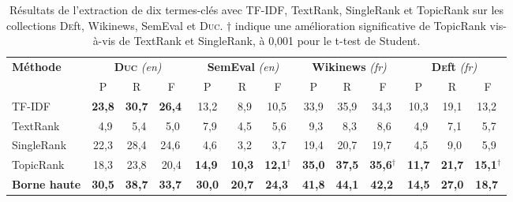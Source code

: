         \begin{table}[t]
          \centering
          \begin{tabular}{l|c@{~~}c@{~~}c@{~}|c@{~~}c@{~~}c@{~}|c@{~~}c@{~~}c@{~}|c@{~~}c@{~~}c@{~}}
            \toprule
            \multirow{2}{*}[-2pt]{\textbf{Méthode}} & \multicolumn{3}{c|}{\textbf{\textsc{Duc}} \textit{(en)}} & \multicolumn{3}{c|}{\textbf{SemEval} \textit{(en)}} & \multicolumn{3}{c|}{\textbf{Wikinews} \textit{(fr)}} & \multicolumn{3}{c}{\textbf{\textsc{De}ft} \textit{(fr)}}\\
            \cline{2-4}\cline{5-7}\cline{8-10}\cline{11-13}
            & P & R & F & P & R & F & P & R & F & P & R & F\\
            \hline
            TF-IDF & \textbf{23,8} & \textbf{30,7} & \textbf{26,4}$^{~}$ & 13,2 & $~~$8,9 & 10,5$^{~}$ & 33,9 & 35,9 & 34,3$^{~}$ & 10,3 & 19,1 & 13,2$^{~}$\\
            TextRank & $~~$4,9 & $~~$5,4 & $~~$5,0$^{~}$ & $~~$7,9 & $~~$4,5 & $~~$5,6$^{~}$ & $~~$9,3 & $~~$8,3 & $~~$8,6$^{~}$ & $~~$4,9 & $~~$7,1 & $~~$5,7$^{~}$\\
            SingleRank & 22,3 & 28,4 & 24,6$^{~}$ & $~~$4,6 & $~~$3,2 & $~~$3,7$^{~}$ & 19,4 & 20,7 & 19,7$^{~}$ & $~~$4,5 & $~~$9,0 & $~~$5,9$^{~}$\\
            TopicRank & 18,3 & 23,8 & 20,4 & \textbf{14,9}$^{~}$ & \textbf{10,3} & \textbf{12,1}$^\dagger$ & \textbf{35,0} & \textbf{37,5} & \textbf{35,6}$^\dagger$ & \textbf{11,7} & \textbf{21,7} & \textbf{15,1}$^\dagger$\\
            \hline
            \textbf{Borne haute} & \textbf{30,5} & \textbf{38,7} & \textbf{33,7}$^{~}$ & \textbf{30,0} & \textbf{20,7} & \textbf{24,3}$^{~}$ & \textbf{41,8} & \textbf{44,1} & \textbf{42,2}$^{~}$ & \textbf{14,5} & \textbf{27,0} & \textbf{18,7}$^{~}$\\
            \bottomrule
          \end{tabular}
          \caption[Résultats de l'extraction de dix termes-clés avec TF-IDF,
                   TextRank, SingleRank et TopicRank sur les collections
                   \textsc{De}ft, Wikinews, SemEval et \textsc{Duc}]{
            Résultats de l'extraction de dix termes-clés avec TF-IDF, TextRank,
            SingleRank et TopicRank sur les collections \textsc{De}ft, Wikinews,
            SemEval et \textsc{Duc}. $\dagger$ indique une amélioration
            significative de TopicRank vis-à-vis de TextRank et SingleRank, à
            0,001 pour le t-test de Student.
            \label{tab:resultats_globaux}
          }
        \end{table}

